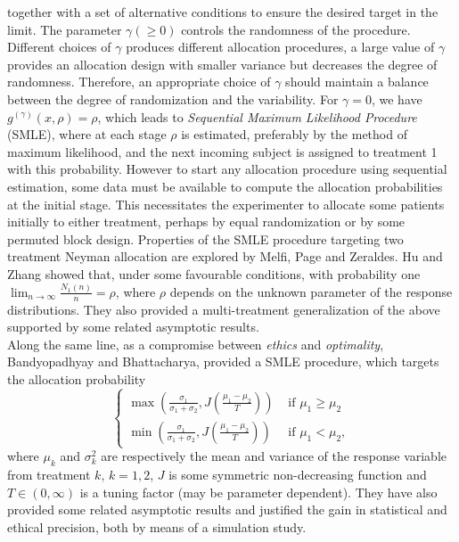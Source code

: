  together with a set of alternative conditions to ensure the desired target in the limit. The parameter $\gamma(\geq 0)$ controls the
randomness of the procedure. Different choices of $\gamma$ produces
different allocation procedures, a large value of $\gamma$ provides
an allocation design with smaller variance but decreases the degree
of randomness. Therefore, an appropriate choice of $\gamma$ should
maintain a balance between the degree of randomization and the
variability. For $\gamma=0$, we have $g^{(\gamma)}(x,\rho)=\rho$,
which leads to \textit{Sequential Maximum Likelihood Procedure}\cite{38}
(SMLE), where at each stage $\rho$ is estimated, preferably by the method of maximum likelihood, and the next incoming subject is assigned to treatment 1 with this probability. However to start any allocation procedure using sequential estimation, some data must be available to compute the
allocation probabilities at the initial stage. This necessitates the
experimenter to allocate some patients initially to either treatment, perhaps by equal randomization or by some permuted block design. Properties of the SMLE procedure targeting two treatment Neyman allocation are explored by  Melfi, Page and Zeraldes\cite{37}. Hu and Zhang\cite{36} showed that, under some favourable conditions, with probability one $\lim_{n\rightarrow\infty}\frac{N_{1}(n)}{n}=\rho$, where $\rho$
depends on the unknown parameter of the response distributions. They\cite{36} also provided a multi-treatment generalization of
the above supported by some related asymptotic results.\\

\noindent Along the same line, as a compromise between
\textit{ethics} and \textit{optimality}, Bandyopadhyay and Bhattacharya\cite{39}, provided a SMLE procedure, which targets the allocation probability
\[\left\{
\begin{array}{ll}
\max \left( \frac {\sigma_1}{\sigma_1 + \sigma_2},
J(\frac{\mu_1-\mu_2}{T}) \right) & \mbox{ if } \mu_1 \geq \mu_2\\
\min \left( \frac
{\sigma_1}{\sigma_1 + \sigma_2} ,J(\frac{\mu_1-\mu_2}{T}) \right) & \mbox{ if } \mu_1 < \mu_2,
\end{array}
\right. \]
where $\mu_{k}$ and  $\sigma^{2}_k$ are respectively the mean and variance of the response variable from treatment $k$, $k=1,2$, $J$ is some symmetric non-decreasing function and $T\in(0,\infty)$ is a tuning factor (may be parameter dependent). They have also provided some related asymptotic results and justified the gain in statistical and ethical precision, both by means of a simulation study.


